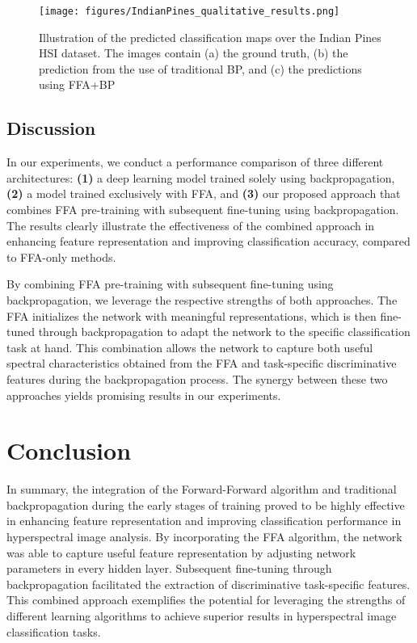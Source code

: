 \documentclass{article}
\begin{document}
\begin{figure}[h!]%
\centering
\texttt{[image: figures/IndianPines\_qualitative\_results.png]}
\caption{Illustration of the predicted classification maps over the Indian Pines HSI dataset. The images contain (a) the ground truth, (b) the prediction from the use of traditional BP, and (c) the predictions using FFA+BP}\label{fig3}
\end{figure}


\subsection{Discussion}


In our experiments, we conduct a performance comparison of three different architectures: \textbf{(1)} a deep learning model trained solely using backpropagation, \textbf{(2)} a model trained exclusively with FFA, and \textbf{(3)} our proposed approach that combines FFA pre-training with subsequent fine-tuning using backpropagation. The results clearly illustrate the effectiveness of the combined approach in enhancing feature representation and improving classification accuracy, compared to FFA-only methods.


By combining FFA pre-training with subsequent fine-tuning using backpropagation, we leverage the respective strengths of both approaches. The FFA initializes the network with meaningful representations, which is then fine-tuned through backpropagation to adapt the network to the specific classification task at hand. This combination allows the network to capture both useful spectral characteristics obtained from the FFA and task-specific discriminative features during the backpropagation process. The synergy between these two approaches yields promising results in our experiments.

\section{Conclusion} \label{sec: conclusion}

In summary, the integration of the Forward-Forward algorithm and traditional backpropagation during the early stages of training proved to be highly effective in enhancing feature representation and improving classification performance in hyperspectral image analysis. By incorporating the FFA algorithm, the network was able to capture useful feature representation by adjusting network parameters in every hidden layer. Subsequent fine-tuning through backpropagation facilitated the extraction of discriminative task-specific features. This combined approach exemplifies the potential for leveraging the strengths of different learning algorithms to achieve superior results in hyperspectral image classification tasks.



\end{document}
